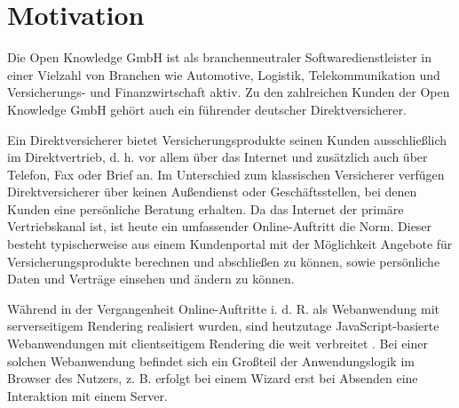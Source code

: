 
\section{Motivation}


Die Open Knowledge GmbH ist als branchenneutraler Softwaredienstleister in einer Vielzahl von Branchen wie Automotive, Logistik, Telekommunikation und Versicherungs- und Finanzwirtschaft aktiv. Zu den zahlreichen Kunden der Open Knowledge GmbH gehört auch ein führender deutscher Direktversicherer. 

Ein Direktversicherer bietet Versicherungsprodukte seinen Kunden ausschließlich im Direktvertrieb, d. h. vor allem über das Internet und zusätzlich auch über Telefon, Fax oder Brief an. Im Unterschied zum klassischen Versicherer verfügen Direktversicherer über keinen Außendienst oder Geschäftsstellen, bei denen Kunden eine persönliche Beratung erhalten. Da das Internet der primäre Vertriebskanal ist, ist heute ein umfassender Online-Auftritt die Norm. Dieser besteht typischerweise aus einem Kundenportal mit der Möglichkeit Angebote für Versicherungsprodukte berechnen und abschließen zu können, sowie persönliche Daten und Verträge einsehen und ändern zu können.


Während in der Vergangenheit Online-Auftritte i. d. R. als Webanwendung mit serverseitigem Rendering realisiert wurden, sind heutzutage JavaScript-basierte Webanwendungen mit clientseitigem Rendering die weit verbreitet \cite{ShiftToClientSideWebApplications}. Bei einer solchen Webanwendung befindet sich ein Großteil der Anwendungslogik im Browser des Nutzers, z. B. erfolgt bei einem Wizard erst bei Absenden eine Interaktion mit einem Server.

